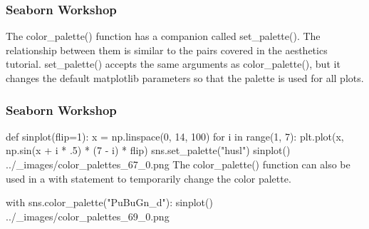 \begin{frame}[fragile]
\frametitle{Seaborn Workshop}
\large

The color_palette() function has a companion called set_palette(). The relationship between them is similar to the pairs covered in the aesthetics tutorial. set_palette() accepts the same arguments as color_palette(), but it changes the default matplotlib parameters so that the palette is used for all plots.
\end{frame}
\begin{frame}[fragile]
	\frametitle{Seaborn Workshop}
	\large
	
def sinplot(flip=1):
    x = np.linspace(0, 14, 100)
    for i in range(1, 7):
        plt.plot(x, np.sin(x + i * .5) * (7 - i) * flip)
sns.set_palette("husl")
sinplot()
../_images/color_palettes_67_0.png
The color_palette() function can also be used in a with statement to temporarily change the color palette.

with sns.color_palette("PuBuGn_d"):
    sinplot()
../_images/color_palettes_69_0.png
\end{frame}

